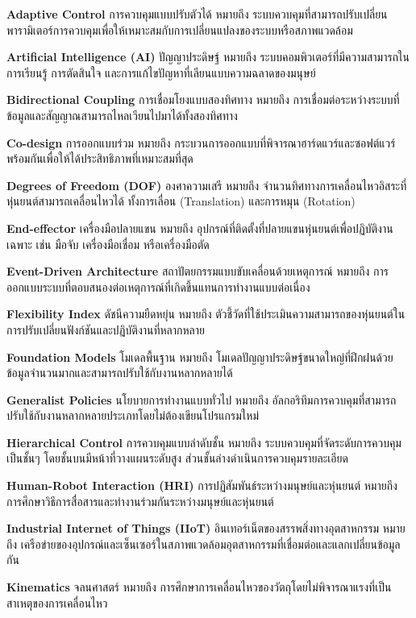 \documentclass[a4paper]{article}
\begin{document}
\textbf{Adaptive Control} การควบคุมแบบปรับตัวได้ หมายถึง ระบบควบคุมที่สามารถปรับเปลี่ยนพารามิเตอร์การควบคุมเพื่อให้เหมาะสมกับการเปลี่ยนแปลงของระบบหรือสภาพแวดล้อม

\textbf{Artificial Intelligence (AI)} ปัญญาประดิษฐ์ หมายถึง ระบบคอมพิวเตอร์ที่มีความสามารถในการเรียนรู้ การตัดสินใจ และการแก้ไขปัญหาที่เลียนแบบความฉลาดของมนุษย์

\textbf{Bidirectional Coupling} การเชื่อมโยงแบบสองทิศทาง หมายถึง การเชื่อมต่อระหว่างระบบที่ข้อมูลและสัญญาณสามารถไหลเวียนไปมาได้ทั้งสองทิศทาง

\textbf{Co-design} การออกแบบร่วม หมายถึง กระบวนการออกแบบที่พิจารณาฮาร์ดแวร์และซอฟต์แวร์พร้อมกันเพื่อให้ได้ประสิทธิภาพที่เหมาะสมที่สุด

\textbf{Degrees of Freedom (DOF)} องศาความเสรี หมายถึง จำนวนทิศทางการเคลื่อนไหวอิสระที่หุ่นยนต์สามารถเคลื่อนไหวได้ ทั้งการเลื่อน (Translation) และการหมุน (Rotation)

\textbf{End-effector} เครื่องมือปลายแขน หมายถึง อุปกรณ์ที่ติดตั้งที่ปลายแขนหุ่นยนต์เพื่อปฏิบัติงานเฉพาะ เช่น มือจับ เครื่องมือเชื่อม หรือเครื่องมือตัด

\textbf{Event-Driven Architecture} สถาปัตยกรรมแบบขับเคลื่อนด้วยเหตุการณ์ หมายถึง การออกแบบระบบที่ตอบสนองต่อเหตุการณ์ที่เกิดขึ้นแทนการทำงานแบบต่อเนื่อง

\textbf{Flexibility Index} ดัชนีความยืดหยุ่น หมายถึง ตัวชี้วัดที่ใช้ประเมินความสามารถของหุ่นยนต์ในการปรับเปลี่ยนฟังก์ชันและปฏิบัติงานที่หลากหลาย

\textbf{Foundation Models} โมเดลพื้นฐาน หมายถึง โมเดลปัญญาประดิษฐ์ขนาดใหญ่ที่ฝึกฝนด้วยข้อมูลจำนวนมากและสามารถปรับใช้กับงานหลากหลายได้

\textbf{Generalist Policies} นโยบายการทำงานแบบทั่วไป หมายถึง อัลกอริทึมการควบคุมที่สามารถปรับใช้กับงานหลากหลายประเภทโดยไม่ต้องเขียนโปรแกรมใหม่

\textbf{Hierarchical Control} การควบคุมแบบลำดับชั้น หมายถึง ระบบควบคุมที่จัดระดับการควบคุมเป็นชั้นๆ โดยชั้นบนมีหน้าที่วางแผนระดับสูง ส่วนชั้นล่างดำเนินการควบคุมรายละเอียด

\textbf{Human-Robot Interaction (HRI)} การปฏิสัมพันธ์ระหว่างมนุษย์และหุ่นยนต์ หมายถึง การศึกษาวิธีการสื่อสารและทำงานร่วมกันระหว่างมนุษย์และหุ่นยนต์

\textbf{Industrial Internet of Things (IIoT)} อินเทอร์เน็ตของสรรพสิ่งทางอุตสาหกรรม หมายถึง เครือข่ายของอุปกรณ์และเซ็นเซอร์ในสภาพแวดล้อมอุตสาหกรรมที่เชื่อมต่อและแลกเปลี่ยนข้อมูลกัน

\textbf{Kinematics} จลนศาสตร์ หมายถึง การศึกษาการเคลื่อนไหวของวัตถุโดยไม่พิจารณาแรงที่เป็นสาเหตุของการเคลื่อนไหว
\end{document}
